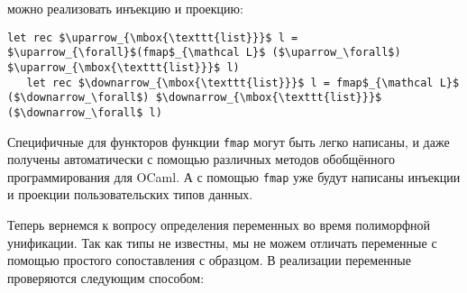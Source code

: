 \noindent можно реализовать инъекцию и проекцию:

\begin{lstlisting}[mathescape=true]
   let rec $\uparrow_{\mbox{\texttt{list}}}$ l = $\uparrow_{\forall}$(fmap$_{\mathcal L}$ ($\uparrow_\forall$) $\uparrow_{\mbox{\texttt{list}}}$ l)
   let rec $\downarrow_{\mbox{\texttt{list}}}$ l = fmap$_{\mathcal L}$ ($\downarrow_\forall$) $\downarrow_{\mbox{\texttt{list}}}$ ($\downarrow_\forall$ l)
\end{lstlisting}

Специфичные для функторов функции \lstinline=fmap= могут быть легко написаны, и даже получены автоматически с помощью различных методов обобщённого программирования для OCaml. А с помощью \lstinline=fmap= уже будут написаны инъекции и проекции пользовательских типов данных.


Теперь вернемся к вопросу определения переменных во время полиморфной унификации.
Так как типы не известны, мы не можем отличать переменные с помощью простого сопоставления с образцом.
В реализации переменные проверяются следующим способом:


